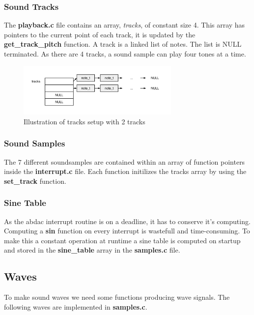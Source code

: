 \subsubsection{Sound Tracks}
The \textbf{playback.c} file contains an array, \textit{tracks}, of constant size 4. This array has pointers to
the current point of each track, it is updated by the \textbf{get\_track\_pitch} function. A track is a linked list of notes. The list is NULL terminated.
As there are 4 tracks, a sound sample can play four tones at a time.
\begin{figure}[h]
  \centerline{\includegraphics[width=300px]{tracks.png}}
  \caption{Illustration of tracks setup with 2 tracks}
\end{figure}

\subsubsection{Sound Samples}
The 7 different soundsamples are contained within an array of function pointers inside
the \textbf{interrupt.c} file.
Each function initilizes the tracks array by using the \textbf{set\_track} function.

\subsubsection{Sine Table}
As the abdac interrupt routine is on a deadline, it has to conserve it's computing. Computing a \textbf{sin}
function on every interrupt is wastefull and time-consuming. To make this a constant operation at runtime
a sine table is computed on startup and stored in the \textbf{sine\_table} array in the \textbf{samples.c} file.

\newpage
\subsection{Waves}

To make sound waves we need some functions producing wave signals. The following waves are implemented
in \textbf{samples.c}.

